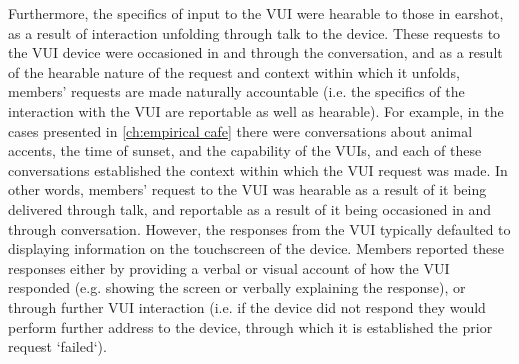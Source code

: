 \begin{revisedsubmission}
Furthermore, the specifics of input to the \ac{VUI} were hearable to those in earshot, as a result of interaction unfolding through talk to the device.
These requests to the \ac{VUI} device were occasioned in and through the conversation, and as a result of the hearable nature of the request and context within which it unfolds, members' requests are made naturally accountable (i.e. the specifics of the interaction with the \ac{VUI} are reportable as well as hearable).
For example, in the cases presented in \ref{ch:empirical cafe} there were conversations about animal accents, the time of sunset, and the capability of the \acp{VUI}, and each of these conversations established the context within which the \ac{VUI} request was made.
In other words, members' request to the \ac{VUI} was hearable as a result of it being delivered through talk, and reportable as a result of it being occasioned in and through conversation.
However, the responses from the \ac{VUI} typically defaulted to displaying information on the touchscreen of the device.
Members reported these responses either by providing a verbal or visual account of how the \ac{VUI} responded (e.g. showing the screen or verbally explaining the response), or through further \ac{VUI} interaction (i.e. if the device did not respond they would perform further address to the device, through which it is established the prior request `failed`).



\end{revisedsubmission}

